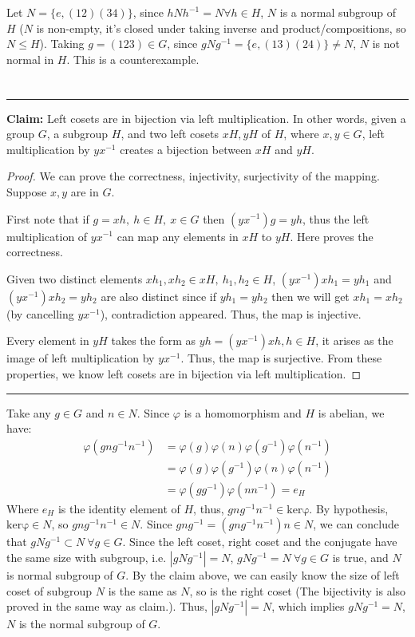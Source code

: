 \documentclass[12pt]{article}
\begin{document}
Let $N=\{e, (12)(34)\}$, since $hNh^{-1}=N\forall h\in H$, $N$ is a normal subgroup of $H$ ($N$ is non-empty, it's closed under taking inverse and product/compositions, so $N\le H$). Taking $g=(123)\in G$, since $gNg^{-1}=\{e,(13)(24)\}\ne N$, $N$ is not normal in $H$. This is a counterexample.
\newpage
\section{} %

\noindent\rule{\textwidth}{1pt}

\textbf{Claim: } Left cosets are in bijection via left multiplication. In other words, given a group $G$, a subgroup $H$, and two left cosets $xH, yH$ of $H$, where $x,y\in G$, left multiplication by $yx^{-1}$ creates a bijection between $xH$ and $yH$.

\begin{proof}
We can prove the correctness, injectivity, surjectivity of the mapping. Suppose $x,y$ are in $G$.

First note that if $g=xh,\ h\in H,\ x\in G$ then $(yx^{-1})g=yh$, thus the left multiplication of $yx^{-1}$ can map any elements in $xH$ to $yH$. Here proves the correctness.

Given two distinct elements $xh_1, xh_2\in xH,\ h_1,h_2\in H$, $(yx^{-1})xh_1=yh_1$ and $(yx^{-1})xh_2=yh_2$ are also distinct since if $yh_1=yh_2$ then we will get $xh_1=xh_2$ (by cancelling $yx^{-1}$), contradiction appeared. Thus, the map is injective.

Every element in $yH$ takes the form as $yh=(yx^{-1})xh,h\in H$, it arises as the image of left multiplication by $yx^{-1}$. Thus, the map is surjective. From these properties, we know left cosets are in bijection via left multiplication.
\end{proof}

\noindent\rule{\textwidth}{1pt}

Take any $g\in G$ and $n\in N$. Since $\varphi$ is a homomorphism and $H$ is abelian, we have:
\begin{align*}
    \varphi(gng^{-1}n^{-1}) &=\varphi(g)\varphi(n)\varphi(g^{-1})\varphi(n^{-1}) \\
    &= \varphi(g)\varphi(g^{-1})\varphi(n)\varphi(n^{-1}) \\
    &= \varphi(gg^{-1})\varphi(nn^{-1})=e_{H}
\end{align*}
Where $e_{H}$ is the identity element of $H$, thus, $gng^{-1}n^{-1}\in\mathrm{ker\varphi}$. By hypothesis, $\mathrm{ker\varphi}\in N$, so $gng^{-1}n^{-1}\in N$. Since $gng^{-1}=(gng^{-1}n^{-1})n\in N$, we can conclude that $gNg^{-1}\subset N\ \forall g\in G$. Since the left coset, right coset and the conjugate have the same size with subgroup, i.e. $|gNg^{-1}|=N$, $gNg^{-1}=N\ \forall g\in G$ is true, and $N$ is normal subgroup of $G$. By the claim above, we can easily know the size of left coset of subgroup $N$ is the same as $N$, so is the right coset (The bijectivity is also proved in the same way as claim.). Thus, $|gNg^{-1}|=N$, which implies $gNg^{-1}=N$, $N$ is the normal subgroup of $G$.
\end{document}

